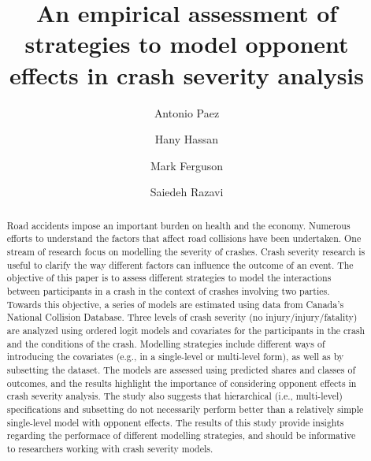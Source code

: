 \documentclass[]{elsarticle} %
\begin{document}
\begin{frontmatter}

  \title{An empirical assessment of strategies to model opponent effects in crash
severity analysis}
    \author[McMaster University]{Antonio Paez}
    \author[Louisiana State University]{Hany Hassan}
    \author[McMaster University]{Mark Ferguson}
    \author[McMaster University]{Saiedeh Razavi}
      \address[McMaster University]{McMaster Institute for Transportation and Logistics, 1280 Main Street
West, Hamilton, Ontario, Canada L8S 4K1}
    \address[Louisiana State University]{Department of Civil and Environmental Engineering, Baton Rouge,
Louisiana, USA 70803}
    
  \begin{abstract}
  Road accidents impose an important burden on health and the economy.
  Numerous efforts to understand the factors that affect road collisions
  have been undertaken. One stream of research focus on modelling the
  severity of crashes. Crash severity research is useful to clarify the
  way different factors can influence the outcome of an event. The
  objective of this paper is to assess different strategies to model the
  interactions between participants in a crash in the context of crashes
  involving two parties. Towards this objective, a series of models are
  estimated using data from Canada's National Collision Database. Three
  levels of crash severity (no injury/injury/fatality) are analyzed using
  ordered logit models and covariates for the participants in the crash
  and the conditions of the crash. Modelling strategies include different
  ways of introducing the covariates (e.g., in a single-level or
  multi-level form), as well as by subsetting the dataset. The models are
  assessed using predicted shares and classes of outcomes, and the results
  highlight the importance of considering opponent effects in crash
  severity analysis. The study also suggests that hierarchical (i.e.,
  multi-level) specifications and subsetting do not necessarily perform
  better than a relatively simple single-level model with opponent
  effects. The results of this study provide insights regarding the
  performace of different modelling strategies, and should be informative
  to researchers working with crash severity models.
  \end{abstract}
  
 \end{frontmatter}
\end{document}
